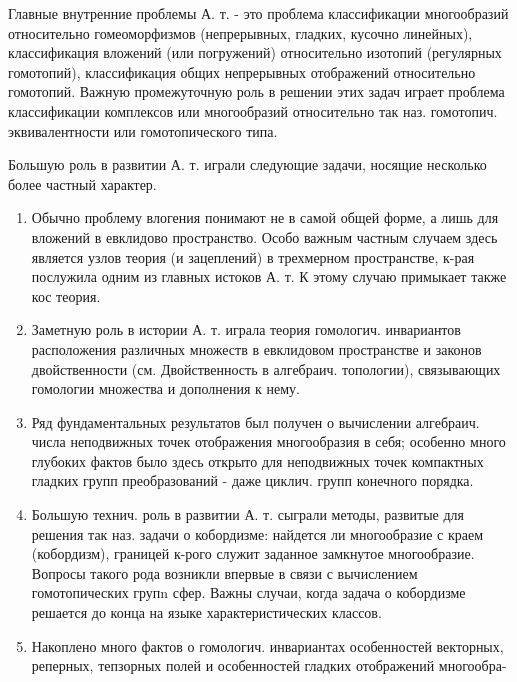 \documentclass[10pt]{article}
\begin{document}
Главные внутренние проблемы А. т. - это проблема классификации многообразий относительно гомеоморфизмов (непрерывных, гладких, кусочно линейных), классификация вложений (или погружений) относительно изотопий (регулярных гомотопий), классификация общих непрерывных отображений относительно гомотопий. Важную промежуточную роль в решении этих задач играет проблема классификации комплексов или многообразий относительно так наз. гомотопич. эквивалентности или гомотопического типа.



Большую роль в развитии А. т. играли следующие задачи, носящие несколько более частный характер.



\begin{enumerate}

  \item Обычно проблему влогения понимают не в самой общей форме, а лишь для вложений в евклидово пространство. Особо важным частным случаем здесь является узлов теория (и зацеплений) в трехмерном пространстве, к-рая послужила одним из главных истоков А. т. К этому случаю примыкает также кос теория.



  \item Заметную роль в истории А. т. играла теория гомологич. инвариантов расположения различных множеств в евклидовом пространстве и законов двойственности (см. Двойственность в алгебраич. топологии), связывающих гомологии множества и дополнения к нему.



  \item Ряд фундаментальных результатов был получен о вычислении алгебраич. числа неподвижных точек отображения многообразия в себя; особенно много глубоких фактов было здесь открыто для неподвижных точек компактных гладких групп преобразований - даже циклич. групп конечного порядка.



  \item Большую технич. роль в развитии А. т. сыграли методы, развитые для решения так наз. задачи о кобордизме: найдется ли многообразие с краем (кобордизм), границей к-рого служит заданное замкнутое многообразие. Вопросы такого рода возникли впервые в связи с вычислением гомотопических групn сфер. Важны случаи, когда задача о кобордизме решается до конца на языке характеристических классов.



  \item Накоплено много фактов о гомологич. инвариантах особенностей векторных, реперных, тепзорных полей и особенностей гладких отображений многообра-



\end{enumerate}
\end{document}
